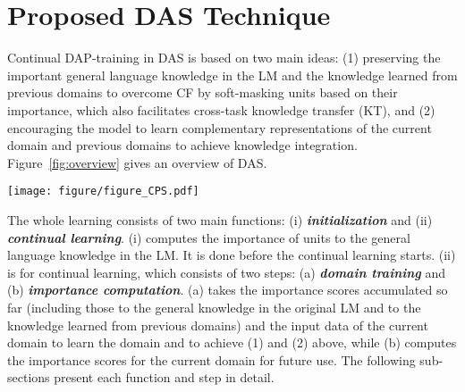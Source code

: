 \documentclass{article} \usepackage{iclr2023_conference,times}
\begin{document}
\section{Proposed DAS Technique}
\label{Sec: preliminary}


























Continual DAP-training in DAS is based on two main ideas: (1) preserving the important general language knowledge in the LM and the knowledge learned from previous domains to overcome CF by soft-masking units based on their importance, which also facilitates cross-task knowledge transfer (KT), and (2) encouraging the model to learn complementary representations of the current domain and previous domains to achieve knowledge integration.
Figure~\ref{fig:overview} gives an overview of DAS. 

\begin{figure*}[t!]
\centering
\texttt{[image: figure/figure\_CPS.pdf]}
 \vspace{-2mm}
\caption{
{\color{black}Illustration of DAS. {\color{black}The red cross indicates that the gradient is not used to update the Transformer but only to compute importance.} 
(A) \textbf{Initialization} (Sec.~\ref{sec:initialization}) computes the importance of units 
for the general knowledge in the LM. (B) \textbf{Domain Training} (Sec.~\ref{sec:training}) trains a new domain using the importance scores as soft-masks and contrasts the previously learned knowledge
and the full knowledge.
(C) \textbf{Importance Computation} (Sec.~\ref{sec:after_training}) computes the importance of the units for the current domain.
}
}
\label{fig:overview}
\vspace{-4mm}
\end{figure*}

{The whole learning consists of two main functions: (i) \textbf{\textit{initialization}} and (ii) \textbf{\textit{continual learning}}. (i) computes the importance of units to the general language knowledge in the LM. It is done before the continual learning starts. (ii) is for continual learning, which consists of two steps: (a) \textbf{\textit{domain training}} and (b) \textbf{\textit{importance computation}}. (a) takes the importance scores accumulated so far (including those to the general knowledge in the original LM and to the knowledge learned from previous domains) and the input data of the current domain to learn the domain and to achieve (1) and (2) above, while (b) computes the importance scores for the current domain for future use. The following sub-sections present each function and step in detail.
}
\end{document}
